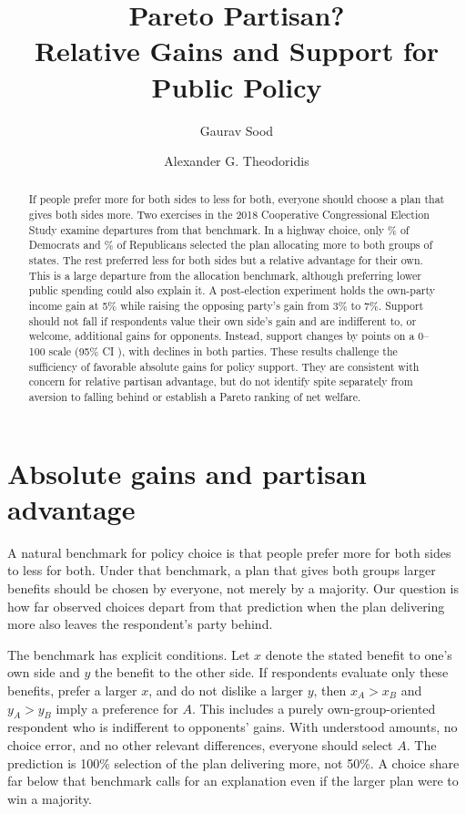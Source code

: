 \documentclass[11pt]{article}
\title{Pareto Partisan?\\Relative Gains and Support for Public Policy}
\author{Gaurav Sood \and Alexander G. Theodoridis}
\date{}
\begin{document}
\maketitle
\begin{abstract}
\noindent If people prefer more for both sides to less for both, everyone should choose a plan that gives both sides more. Two exercises in the 2018 Cooperative Congressional Election Study examine departures from that benchmark. In a highway choice, only \HighwayDemLarger{}\% of Democrats and \HighwayRepLarger{}\% of Republicans selected the plan allocating more to both groups of states. The rest preferred less for both sides but a relative advantage for their own. This is a large departure from the allocation benchmark, although preferring lower public spending could also explain it. A post-election experiment holds the own-party income gain at 5\% while raising the opposing party's gain from 3\% to 7\%. Support should not fall if respondents value their own side's gain and are indifferent to, or welcome, additional gains for opponents. Instead, support changes by \IncomePoolEstimate{} points on a 0--100 scale (95\% CI \IncomePoolCI{}), with declines in both parties. These results challenge the sufficiency of favorable absolute gains for policy support. They are consistent with concern for relative partisan advantage, but do not identify spite separately from aversion to falling behind or establish a Pareto ranking of net welfare.
\end{abstract}

\section{Absolute gains and partisan advantage}
A natural benchmark for policy choice is that people prefer more for both sides to less for both. Under that benchmark, a plan that gives both groups larger benefits should be chosen by everyone, not merely by a majority. Our question is how far observed choices depart from that prediction when the plan delivering more also leaves the respondent's party behind.

The benchmark has explicit conditions. Let $x$ denote the stated benefit to one's own side and $y$ the benefit to the other side. If respondents evaluate only these benefits, prefer a larger $x$, and do not dislike a larger $y$, then $x_A>x_B$ and $y_A>y_B$ imply a preference for $A$. This includes a purely own-group-oriented respondent who is indifferent to opponents' gains. With understood amounts, no choice error, and no other relevant differences, everyone should select $A$. The prediction is 100\% selection of the plan delivering more, not 50\%. A choice share far below that benchmark calls for an explanation even if the larger plan were to win a majority.
\end{document}
